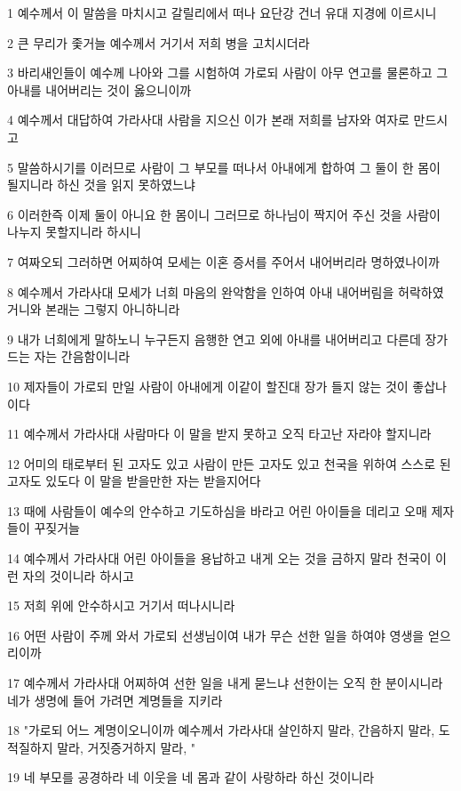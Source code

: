 \par 1 예수께서 이 말씀을 마치시고 갈릴리에서 떠나 요단강 건너 유대 지경에 이르시니
\par 2 큰 무리가 좇거늘 예수께서 거기서 저희 병을 고치시더라
\par 3 바리새인들이 예수께 나아와 그를 시험하여 가로되 사람이 아무 연고를 물론하고 그 아내를 내어버리는 것이 옳으니이까
\par 4 예수께서 대답하여 가라사대 사람을 지으신 이가 본래 저희를 남자와 여자로 만드시고
\par 5 말씀하시기를 이러므로 사람이 그 부모를 떠나서 아내에게 합하여 그 둘이 한 몸이 될지니라 하신 것을 읽지 못하였느냐
\par 6 이러한즉 이제 둘이 아니요 한 몸이니 그러므로 하나님이 짝지어 주신 것을 사람이 나누지 못할지니라 하시니
\par 7 여짜오되 그러하면 어찌하여 모세는 이혼 증서를 주어서 내어버리라 명하였나이까
\par 8 예수께서 가라사대 모세가 너희 마음의 완악함을 인하여 아내 내어버림을 허락하였거니와 본래는 그렇지 아니하니라
\par 9 내가 너희에게 말하노니 누구든지 음행한 연고 외에 아내를 내어버리고 다른데 장가 드는 자는 간음함이니라
\par 10 제자들이 가로되 만일 사람이 아내에게 이같이 할진대 장가 들지 않는 것이 좋삽나이다
\par 11 예수께서 가라사대 사람마다 이 말을 받지 못하고 오직 타고난 자라야 할지니라
\par 12 어미의 태로부터 된 고자도 있고 사람이 만든 고자도 있고 천국을 위하여 스스로 된 고자도 있도다 이 말을 받을만한 자는 받을지어다
\par 13 때에 사람들이 예수의 안수하고 기도하심을 바라고 어린 아이들을 데리고 오매 제자들이 꾸짖거늘
\par 14 예수께서 가라사대 어린 아이들을 용납하고 내게 오는 것을 금하지 말라 천국이 이런 자의 것이니라 하시고
\par 15 저희 위에 안수하시고 거기서 떠나시니라
\par 16 어떤 사람이 주께 와서 가로되 선생님이여 내가 무슨 선한 일을 하여야 영생을 얻으리이까
\par 17 예수께서 가라사대 어찌하여 선한 일을 내게 묻느냐 선한이는 오직 한 분이시니라 네가 생명에 들어 가려면 계명들을 지키라
\par 18 "가로되 어느 계명이오니이까 예수께서 가라사대 살인하지 말라, 간음하지 말라, 도적질하지 말라, 거짓증거하지 말라, "
\par 19 네 부모를 공경하라 네 이웃을 네 몸과 같이 사랑하라 하신 것이니라
